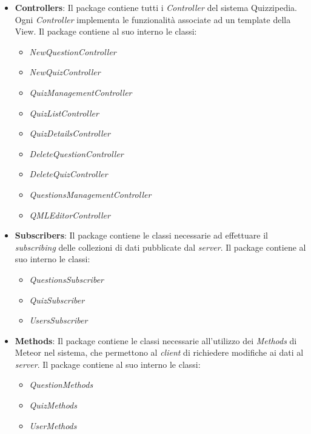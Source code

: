 	\begin{itemize}
	\item \textbf{Controllers}: Il package contiene tutti i \emph{Controller} del sistema Quizzipedia. Ogni \emph{Controller} implementa le funzionalità associate ad un template della View.
	Il package contiene al suo interno le classi:
	\begin{itemize}
		\item \textit{NewQuestionController}
		\item \textit{NewQuizController}
		\item \textit{QuizManagementController}
		\item \textit{QuizListController}
		\item \textit{QuizDetailsController}
		\item \textit{DeleteQuestionController}
		\item \textit{DeleteQuizController}
		\item \textit{QuestionsManagementController}
		\item \textit{QMLEditorController}
	\end{itemize}	
	
	\item \textbf{Subscribers}: Il package contiene le classi necessarie ad effettuare il \emph{subscribing} delle collezioni di dati pubblicate dal \emph{server}.
	Il package contiene al suo interno le classi:
	\begin{itemize}
		\item \textit{QuestionsSubscriber}
		\item \textit{QuizSubscriber}
		\item \textit{UsersSubscriber}
	\end{itemize}
	
	\item \textbf{Methods}: Il package contiene le classi necessarie all'utilizzo dei \emph{Methods} di Meteor nel sistema, che permettono al \emph{client} di richiedere modifiche ai dati al \emph{server}.
	Il package contiene al suo interno le classi:
	\begin{itemize}
		\item \textit{QuestionMethods}
		\item \textit{QuizMethods}
		\item \textit{UserMethods}
	\end{itemize}
	

\end{itemize}
